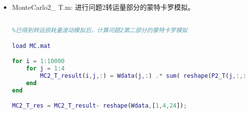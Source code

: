 \documentclass{my_paper}
\begin{document}
\begin{itemize}
\begin{lstlisting}[language={Matlab}]
        tot_cost = tot_cost + sum(store);
        target = 28200;
        A_used = 0; B_used = 0; C_used = 0;
        if store(3)>0
            C_used = min(target, store(3)./0.72);
            target = target - C_used;
            store(3) = store(3) - C_used*0.72;
        end
        if target > 0 && store(2)>0
            B_used = min(target, store(2)./0.66);
            target = target - B_used;
            store(2) = store(2) - B_used*0.66;
        end
        if target > 0 && store(1)>0
            A_used = min(target, store(1)./0.60);
            target = target - A_used;
            store(1) = store(1) - A_used*0.60;
        end
        
        store = store + In(week,:);
        
        if store' * [1/0.6 1/0.66 1/0.72] < 56400
            disp("store < 56400");
            err_flag = 1;
            continue % 继续执行完当前生产过程
        end
    end
    
    MC3_cost = [MC3_cost tot_cost];
    MC3_store = [MC3_store; store];
    if err_flag == 1
        MC3_err_count = MC3_err_count + 1;
    end
end

disp("Finished")
\end{lstlisting}


\item MonteCarlo2\_ T.m:  进行问题2转运量部分的蒙特卡罗模拟。
\begin{lstlisting}[language={Matlab}]

%已得到转运损耗量波动模拟后，计算问题2第二部分的蒙特卡罗模拟

load MC.mat

for i = 1:10000
    for j = 1:4
        MC2_T_result(i,j,:) = Wdata(j,:) .* sum( reshape(P2_T(j,:,:),[8 24]) .* (1-0.01.*reshape(MC2_T_sim(i,:,:),[8 24])));
    end
end

MC2_T_res = MC2_T_result- reshape(Wdata,[1,4,24]);

\end{lstlisting}

\end{itemize}

\iffalse
除了支撑材料的文件列表和源程序代码外，附录中还可以包括下面内容：
\begin{itemize}
\item 某一问题的详细证明或求解过程；
\item 自己在网上找到的数据；
\item 比较大的流程图；
\item 较繁杂的图表或计算结果
\end{itemize}
\fi 
\end{document}
